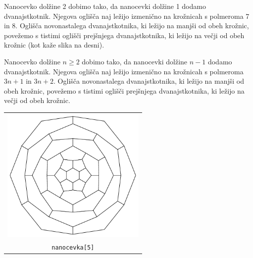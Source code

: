 \documentclass[arhiv]{../izpit}
\begin{document}
Nanocevko dolžine 2 dobimo tako, da nanocevki dolžine 1 dodamo dvanajstkotnik. Njegova oglišča naj ležijo izmenično na krožnicah s polmeroma 7 in 8.
Oglišča novonastalega dvanajstkotnika, ki ležijo na manjši od obeh krožnic, povežemo s tistimi oglišči prejšnjega dvanajstkotnika, ki ležijo na večji od obeh krožnic (kot kaže slika na desni).

Nanocevko dolžine $n \geq 2$ dobimo tako, da nanocevki dolžine $n-1$ dodamo dvanajstkotnik. Njegova oglišča naj ležijo izmenično na krožnicah s polmeroma $3n+1$ in $3n+2$.
Oglišča novonastalega dvanajstkotnika, ki ležijo na manjši od obeh krožnic, povežemo s tistimi oglišči prejšnjega dvanajstkotnika, ki ležijo na večji od obeh krožnic.


\begin{center}
\begin{tabular}{c}
 \includegraphics[width=7cm]{cevka5.pdf}\\
  \texttt{nanocevka[5]}
\end{tabular}
\end{center}



%
%
%
%
\end{document}
